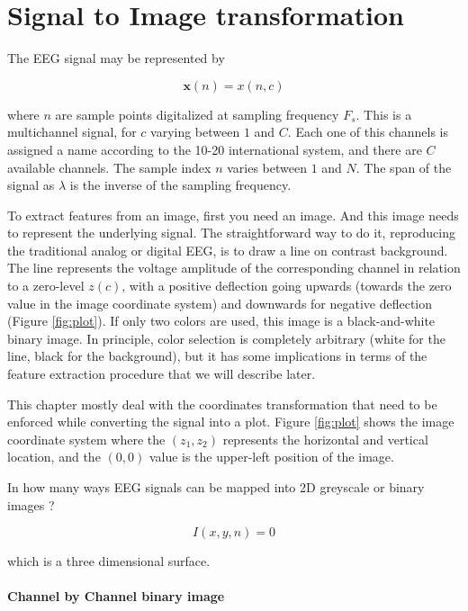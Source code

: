 \section{Signal to Image transformation}

The EEG signal may be represented by

\begin{equation}
\mathbf{x}(n) = x(n,c)
\label{eq:zerolevel}
\end{equation}

\noindent where $n$ are sample points digitalized at sampling frequency $F_s$.  This is a multichannel signal, for $c$ varying between $1$ and $C$.  Each one of this channels is assigned a name according to the 10-20 international system, and there are $C$ available channels. The sample index $n$ varies between $1$ and $N$.  The span of the signal as $\lambda$ is the inverse of the sampling frequency.
 
To extract features from an image, first you need an image.  And this image needs to represent the underlying signal.  The straightforward way to do it, reproducing the traditional analog or digital EEG, is to draw a line on contrast background.  The line represents the voltage amplitude of the corresponding channel in relation to a zero-level $z(c)$, with a positive deflection going upwards (towards the zero value in the image coordinate system) and downwards for negative deflection (Figure \ref{fig:plot}).  If only two colors are used, this image is a black-and-white binary image.  In principle, color selection is completely arbitrary (white for the line, black for the background), but it has some implications in terms of the feature extraction procedure that we will describe later.

This chapter mostly deal with the coordinates transformation that need to be enforced while converting the signal into a plot.  Figure \ref{fig:plot} shows the image coordinate system where the $(z_1,z_2)$ represents the horizontal and vertical location, and the $(0,0)$ value is the upper-left position of the image.

In how many ways EEG signals can be mapped into 2D greyscale or binary images ?

\begin{equation}
I(x,y,n) = 0
\label{eq:standarizedaverages}
\end{equation}

which is a three dimensional surface.

\paragraph{Channel by Channel binary image }

